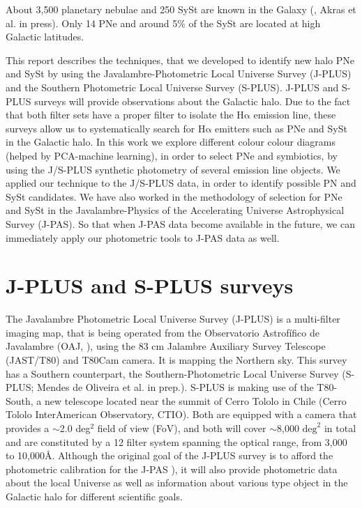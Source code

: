 \documentclass{article}
\newcommand\ha{\ensuremath{\mathrm{H\alpha}}}
\begin{document}
About 3,500 planetary nebulae \citep{Parker:2017} and 250 SySt are known in the Galaxy (\citealp{Rodriguez:2014}, Akras et al. in press). Only 14 PNe and around 5\% of the SySt are located at high Galactic latitudes.


This report describes the techniques, that we developed to identify new halo PNe and SySt by using the Javalambre-Photometric Local Universe Survey (J-PLUS) and the Southern Photometric Local Universe Survey (S-PLUS). J-PLUS and S-PLUS surveys will provide observations about the Galactic halo. Due to the fact that both filter sets have a proper filter to isolate the \ha{} emission line, these surveys allow us to systematically  search for \ha{} emitters such as PNe and SySt in the Galactic halo. In this work we explore different colour colour diagrams (helped by PCA-machine learning), in order to select PNe and symbiotics, by using the J/S-PLUS synthetic photometry  of several  emission line objects. We applied our technique to the J/S-PLUS data, in order to identify possible PN and SySt candidates. We have also worked in the methodology of selection for PNe and SySt in the Javalambre-Physics of the Accelerating Universe Astrophysical Survey (J-PAS). So that when J-PAS data become available in the future, we can immediately apply our photometric tools to J-PAS data as well. 

\section{J-PLUS and S-PLUS surveys}
\label{sec:surveys}

The Javalambre Photometric Local Universe Survey (J-PLUS) is a multi-filter imaging map, that is being operated from the Observatorio Astrofífico de Javalambre (OAJ, \citealp{Cenarro:2018}), using the 83 cm Jalambre Auxiliary Survey Telescope (JAST/T80) and T80Cam camera. It is mapping the Northern sky. This survey has a Southern counterpart, the Southern-Photometric Local Universe Survey (S-PLUS; Mendes de Oliveira et al. in prep.). S-PLUS is making use of the T80-South, a new telescope located near the summit of Cerro Tololo in Chile (Cerro Tololo InterAmerican Observatory, CTIO). Both are equipped with a camera that provides a \(\sim\)2.0 deg$^2$ field of view (FoV), and both will cover \(\sim\)8,000 \(\mathrm{deg}^{2}\) in total and are constituted by a 12 filter system spanning the optical range, from 3,000 to 10,000\AA. Although the original goal of the J-PLUS survey is to afford the photometric calibration for the J-PAS \citep{Benitez:2014}), it will also provide photometric data about the local Universe as well as information about various type object in the Galactic halo for different scientific goals. 
\end{document}
